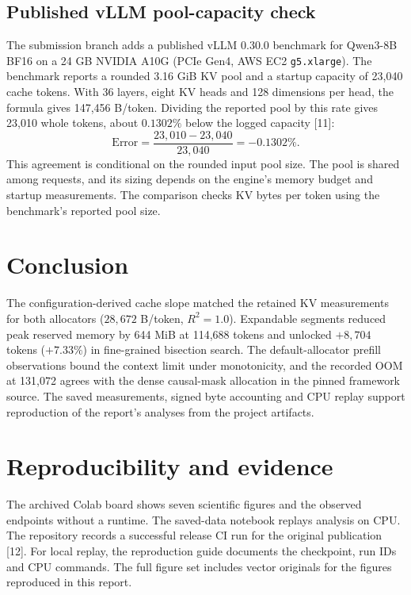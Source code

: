 \documentclass[11pt,a4paper]{article}
\begin{document}
\subsection{Published vLLM pool-capacity check}
The submission branch adds a published vLLM 0.30.0 benchmark for Qwen3-8B BF16 on a 24 GB NVIDIA A10G (PCIe Gen4, AWS EC2 \texttt{g5.xlarge}). The benchmark reports a rounded 3.16 GiB KV pool and a startup capacity of 23,040 cache tokens. With 36 layers, eight KV heads and 128 dimensions per head, the formula gives 147,456 B/token. Dividing the reported pool by this rate gives 23,010 whole tokens, about $0.1302\%$ below the logged capacity [11]:
\begin{equation*}
\text{Error} = \frac{23{,}010 - 23{,}040}{23{,}040} = -0.1302\%.
\end{equation*}
This agreement is conditional on the rounded input pool size. The pool is shared among requests, and its sizing depends on the engine's memory budget and startup measurements. The comparison checks KV bytes per token using the benchmark's reported pool size.

\section{Conclusion}
The configuration-derived cache slope matched the retained KV measurements for both allocators ($28{,}672$ B/token, $R^2 = 1.0$). Expandable segments reduced peak reserved memory by 644 MiB at 114,688 tokens and unlocked $+8{,}704$ tokens ($+7.33\%$) in fine-grained bisection search. The default-allocator prefill observations bound the context limit under monotonicity, and the recorded OOM at 131,072 agrees with the dense causal-mask allocation in the pinned framework source. The saved measurements, signed byte accounting and CPU replay support reproduction of the report's analyses from the project artifacts.

\section{Reproducibility and evidence}
The archived Colab board shows seven scientific figures and the observed endpoints without a runtime. The saved-data notebook replays analysis on CPU. The repository records a successful release CI run for the original publication [12]. For local replay, the reproduction guide documents the checkpoint, run IDs and CPU commands. The full figure set includes vector originals for the figures reproduced in this report.
\end{document}
